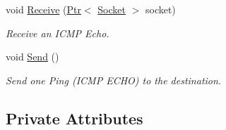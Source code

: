 \begin{DoxyCompactItemize}
void \hyperlink{classns3_1_1V4Ping_a87c38673f7b4c568d114c2815ff2aa78}{Receive} (\hyperlink{classns3_1_1Ptr}{Ptr}$<$ \hyperlink{classns3_1_1Socket}{Socket} $>$ socket)
\begin{DoxyCompactList}\small\item\em Receive an I\+C\+MP Echo. \end{DoxyCompactList}\item 
void \hyperlink{classns3_1_1V4Ping_a26d3a4285998df72a37dfa62b9097e4b}{Send} ()
\begin{DoxyCompactList}\small\item\em Send one Ping (I\+C\+MP E\+C\+HO) to the destination. \end{DoxyCompactList}\end{DoxyCompactItemize}
\subsection*{Private Attributes}

